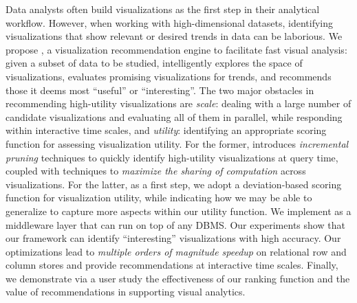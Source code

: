 Data analysts often build visualizations
as the first step in their analytical workflow.
However, when working with high-dimensional datasets, identifying visualizations
that show relevant or desired trends in data can be laborious.
We propose \SeeDB, a visualization recommendation engine to facilitate fast 
visual analysis: 
given a subset of data to be studied, \SeeDB intelligently explores the 
space of visualizations, evaluates promising visualizations for trends, and 
recommends those it 
deems most ``useful'' or ``interesting''. %
The two major obstacles in recommending high-utility visualizations are {\em scale}:
dealing with a large number of candidate visualizations and evaluating all of them in parallel, while
responding within interactive time scales, and {\em utility}: identifying 
an appropriate scoring function for assessing visualization utility.
For the former, \SeeDB introduces {\em incremental 
pruning} techniques to quickly identify high-utility visualizations at query time,
coupled with techniques to {\em maximize 
the sharing of computation} across visualizations.
For the latter, as a first step, %
we adopt a 
deviation-based scoring function for visualization 
utility, while indicating how we may be able to generalize to capture more aspects
within our utility function.
We implement \SeeDB as a middleware layer that can run on top of any DBMS. 
Our experiments show that our framework can identify ``interesting'' visualizations with high accuracy. 
Our optimizations lead to 
{\em multiple orders of magnitude speedup} on relational row and column stores and provide
recommendations at interactive time scales.
Finally, we demonstrate via a user study the effectiveness of our ranking function
and the value of recommendations in supporting visual analytics. 
